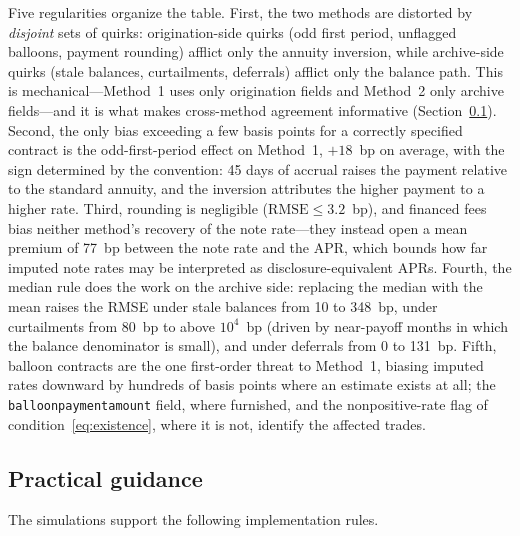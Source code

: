 Five regularities organize the table. First, the two methods are distorted by \emph{disjoint} sets of quirks: origination-side quirks (odd first period, unflagged balloons, payment rounding) afflict only the annuity inversion, while archive-side quirks (stale balances, curtailments, deferrals) afflict only the balance path. This is mechanical---Method~1 uses only origination fields and Method~2 only archive fields---and it is what makes cross-method agreement informative (Section~\ref{appendix:rateimputation:guidance}). Second, the only bias exceeding a few basis points for a correctly specified contract is the odd-first-period effect on Method~1, $+18$~bp on average, with the sign determined by the convention: 45 days of accrual raises the payment relative to the standard annuity, and the inversion attributes the higher payment to a higher rate. Third, rounding is negligible ($\mathrm{RMSE} \le 3.2$~bp), and financed fees bias neither method's recovery of the note rate---they instead open a mean premium of 77~bp between the note rate and the APR, which bounds how far imputed note rates may be interpreted as disclosure-equivalent APRs. Fourth, the median rule does the work on the archive side: replacing the median with the mean raises the RMSE under stale balances from 10 to 348~bp, under curtailments from 80~bp to above $10^{4}$~bp (driven by near-payoff months in which the balance denominator is small), and under deferrals from 0 to 131~bp. Fifth, balloon contracts are the one first-order threat to Method~1, biasing imputed rates downward by hundreds of basis points where an estimate exists at all; the \texttt{balloon\allowbreak payment\allowbreak amount} field, where furnished, and the nonpositive-rate flag of condition~\eqref{eq:existence}, where it is not, identify the affected trades.

\subsection{Practical guidance}\label{appendix:rateimputation:guidance}

The simulations support the following implementation rules.

